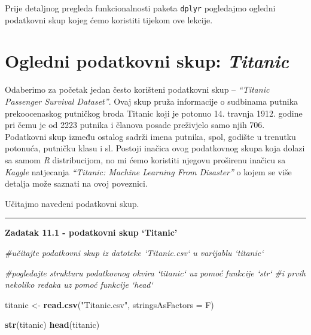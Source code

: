 \documentclass[]{book}
\newenvironment{Shaded}{\begin{snugshade}}{\end{snugshade}}
\newcommand{\KeywordTok}[1]{\textcolor[rgb]{0.13,0.29,0.53}{\textbf{#1}}}
\newcommand{\DataTypeTok}[1]{\textcolor[rgb]{0.13,0.29,0.53}{#1}}
\newcommand{\StringTok}[1]{\textcolor[rgb]{0.31,0.60,0.02}{#1}}
\newcommand{\CommentTok}[1]{\textcolor[rgb]{0.56,0.35,0.01}{\textit{#1}}}
\newcommand{\NormalTok}[1]{#1}
\theoremstyle{definition}
\theoremstyle{definition}
\theoremstyle{definition}
\theoremstyle{remark}
\begin{document}
Prije detaljnog pregleda funkcionalnosti paketa \texttt{dplyr}
pogledajmo ogledni podatkovni skup kojeg ćemo koristiti tijekom ove
lekcije.

\section{\texorpdfstring{Ogledni podatkovni skup:
\emph{Titanic}}{Ogledni podatkovni skup: Titanic}}\label{ogledni-podatkovni-skup-titanic}

Odaberimo za početak jedan često korišteni podatkovni skup --
\emph{``Titanic Passenger Survival Dataset''}. Ovaj skup pruža
informacije o sudbinama putnika prekoocenaskog putničkog broda Titanic
koji je potonuo 14. travnja 1912. godine pri čemu je od 2223 putnika i
članova posade preživjelo samo njih 706. Podatkovni skup između ostalog
sadrži imena putnika, spol, godište u trenutku potonuća, putničku klasu
i sl. Postoji inačica ovog podatkovnog skupa koja dolazi sa samom
\emph{R} distribucijom, no mi ćemo koristiti njegovu proširenu inačicu
sa \emph{Kaggle} natjecanja \emph{``Titanic: Machine Learning From
Disaster''} o kojem se više detalja može saznati na ovoj poveznici.

Učitajmo navedeni podatkovni skup.

\begin{center}\rule{0.5\linewidth}{\linethickness}\end{center}

\textbf{Zadatak 11.1 - podatkovni skup `Titanic'}

\begin{Shaded}
\begin{Highlighting}[]
\CommentTok{#učitajte podatkovni skup iz datoteke `Titanic.csv` u varijablu `titanic`}

\CommentTok{#pogledajte strukturu podatkovnog okvira `titanic` uz pomoć funkcije `str`}
\CommentTok{#i prvih nekoliko redaka uz pomoć funkcije `head`}
\end{Highlighting}
\end{Shaded}

\begin{Shaded}
\begin{Highlighting}[]
\NormalTok{titanic <-}\StringTok{ }\KeywordTok{read.csv}\NormalTok{(}\StringTok{"Titanic.csv"}\NormalTok{, }\DataTypeTok{stringsAsFactors =}\NormalTok{ F)}

\KeywordTok{str}\NormalTok{(titanic)}
\KeywordTok{head}\NormalTok{(titanic)}
\end{Highlighting}
\end{Shaded}
\end{document}

